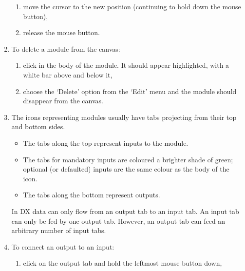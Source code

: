 \documentclass[twoside,11pt]{starlink}
\begin{document}
\begin{enumerate}
\begin{enumerate}
    \item move the cursor to the new position (continuing to hold down
     the mouse button),

    \item release the mouse button.

  \end{enumerate}

  \item To delete a module from the canvas:

  \begin{enumerate}

    \item click in the body of the module. It should appear highlighted,
     with a white bar above and below it,

    \item choose the `Delete' option from the `Edit' menu and the module
     should disappear from the canvas.

  \end{enumerate}

  \item The icons representing modules usually have tabs projecting
   from their top and bottom sides.

  \begin{itemize}

    \item The tabs along the top represent inputs to the module.

    \item The tabs for mandatory inputs are coloured a brighter shade
     of green; optional (or defaulted) inputs are the same colour as
     the body of the icon.

    \item The tabs along the bottom represent outputs.

  \end{itemize}

   In DX data can only flow from an output tab to an input tab. An
   input tab can only be fed by one output tab. However, an output tab
   can feed an arbitrary number of input tabs.

  \item To connect an output to an input:

  \begin{enumerate}

    \item click on the output tab and hold the leftmost mouse button
     down,


\end{enumerate}
\end{enumerate}
\end{document}
